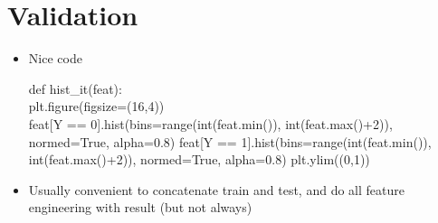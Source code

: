 \documentclass[a4paper]{report}
\newcommand{\brown}{\color{brown}}
\renewcommand{\t}{\hspace*{0.5cm}}
\newenvironment{tightcenter}{
  \setlength\topsep{0pt}
  \setlength\parskip{0pt}
  \begin{center}
  }{
  \end{center}
}
\newenvironment{codesnip}[1]
{\begin{tightcenter}\begin{minipage}{.85\textwidth}#1}
{\end{minipage}\end{tightcenter}}
\begin{document}
\section{Validation}
\begin{itemize}
  \item Nice code
    \begin{codesnip}{\brown}
      def hist\_it(feat): \\
      \t plt.figure(figsize=(16,4))\\
      \t feat[Y == 0].hist(bins=range(int(feat.min()), int(feat.max()+2)), normed=True, alpha=0.8)
      \t feat[Y == 1].hist(bins=range(int(feat.min()), int(feat.max()+2)), normed=True, alpha=0.8)
      \t plt.ylim((0,1))

    \end{codesnip}
  \item Usually convenient to concatenate train and test, and do all feature engineering with result (but not always)


\end{itemize}
\end{document}
